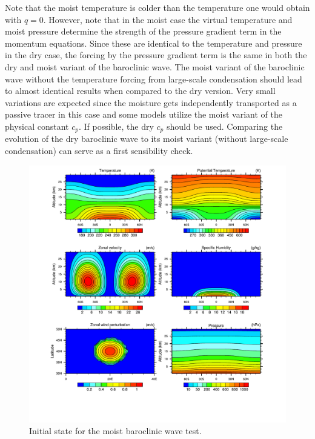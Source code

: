\documentclass[times,doublespace]{fldauth}
\begin{document}
Note that the moist temperature is colder than the temperature one would obtain with $q = 0$. However, note that in the moist case the virtual temperature and moist pressure determine the strength of the pressure gradient term in the momentum equations. Since these are identical to the temperature and pressure in the dry case, the forcing by the pressure gradient term is the same in both the dry and moist variant of the baroclinic wave. The moist variant of the baroclinic wave without the temperature forcing from large-scale condensation should lead to almost identical results when compared to the dry version. Very small variations are expected since the moisture gets independently transported as a passive tracer in this case and some models utilize the moist variant of the physical constant $c_p$. If possible, the dry $c_p$ should be used. Comparing the evolution of the dry baroclinic wave to its moist variant (without large-scale condensation) can serve as a first sensibility check.

\begin{figure}[tb]
\center\includegraphics[width=\linewidth]{plot_baroclinicwave_init.pdf}
  \caption{Initial state for the moist baroclinic wave test.}\label{fig:baroclinicwave_init}
\end{figure} 

%
%
%
%
%
\end{document}
